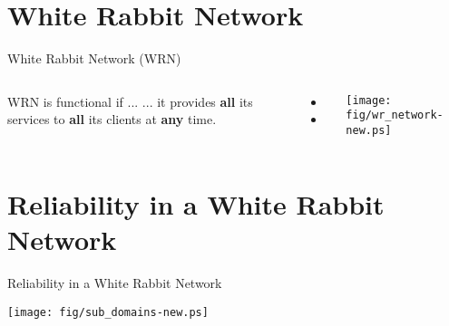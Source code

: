 \documentclass[compress, red]{beamer}
\begin{document}
\section{White Rabbit Network}
\begin{frame}{White Rabbit Network (WRN)}


\begin{columns}[c]

    \begin{block}{WRN is functional if ...}
    ... it provides {\bf all} its services to {\bf all} its clients at {\bf any} time.
    \end{block}

  \vspace{0.2cm}

  \begin{itemize}
    \item \color{blue!90}{Sub-nanosecond time synchronization}
    \item \color{red}{Deterministic Control Data delivery}
  \end{itemize}

    \begin{center}
    \texttt{[image: fig/wr\_network-new.ps]}
    \end{center}
\end{columns}
  

\end{frame}
\section{Reliability in a White Rabbit Network}
\begin{frame}{Reliability in a White Rabbit Network}


    \begin{center}
    \texttt{[image: fig/sub\_domains-new.ps]}
    \end{center}

  

\end{frame}
\end{document}
